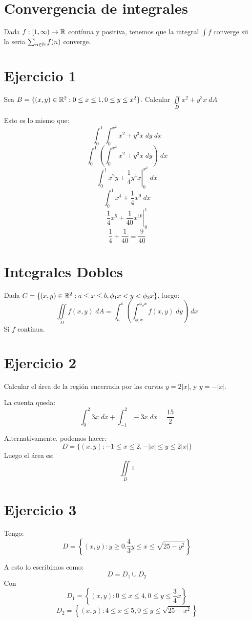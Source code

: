 \documentclass{article}
\begin{document}
\section*{Convergencia de integrales}
Dada $f : [1, \infty) \to \mathbb{R}$ contínua y positiva, tenemos que la integral $\int f$ converge sii la seria $\sum_{n \in \mathbb{N}} f(n)$ converge.
\section*{Ejercicio 1}
Sea $B = \{(x,y) \in \mathbb{R}^2 : 0 \leq x \leq 1, 0 \leq y \leq x^2\}$. Calcular $
\iint\limits_D
x^2 + y^3x  \; dA$

Esto es lo mismo que:
\[
	\int_0^1 \int_0^{x^2} x^2 + y^3x \; dy \; dx
\]
\[
	\int_0^1 \left(\int_0^{x^2} x^2 + y^3x \; dy \right)\; dx
\]
\[
	\int_0^1 \left. x^2y + \frac{1}{4}y^4x\right|_0^{x^2}\; dx
\]
\[
	\int_0^1 x^4 + \frac{1}{4}x^9\; dx
\]
\[
	\left. \frac{1}{4}x^5 + \frac{1}{40}x^{10} \right|_0^1
\]
\[
	\frac{1}{4} + \frac{1}{40} = \frac{9}{40}
\]

\section*{Integrales Dobles}
Dada $C = \{(x,y) \in \mathbb{R}^2 : a \leq x \leq b, \phi_1 x < y < \phi_2 x\}$, luego:
\[
	\iint\limits_D f(x,y) \; dA = \int_a^b \left(\int_{\phi_1 x}^{\phi_2 x} f(x, y) \; dy\right) \; dx
\]
Si $f$ contínua.

\section*{Ejercicio 2}
Calcular el área de la región encerrada por las curvas $y = 2|x|$, y $y = -|x|$.

La cuenta queda:
\[
	\int_0^2 3x \; dx + \int_{-1}^2 -3x \; dx = \frac{15}{2}
\]

Alternativamente, podemos hacer:
\[
	D = \{(x,y) : -1 \leq x \leq 2, -|x| \leq y \leq 2|x|\}
\]
Luego el área es:
\[
	\iint\limits_D 1
\]

\section*{Ejercicio 3}
Tengo:
\[D = \left\{(x,y) : y \geq 0. \frac{4}{3} y \leq x \leq \sqrt{25 - y^2}\right\}\]

A esto lo escribimos como:
\[D = D_1 \cup D_2\]
Con
\[
	D_1 = \left\{(x,y) : 0 \leq x \leq 4, 0 \leq y \leq \frac{3}{4}x\right\}
\]
\[
	D_2 = \left\{(x,y) : 4 \leq x \leq 5, 0 \leq y \leq \sqrt{25 - x^2}\right\}
\]
\end{document}
